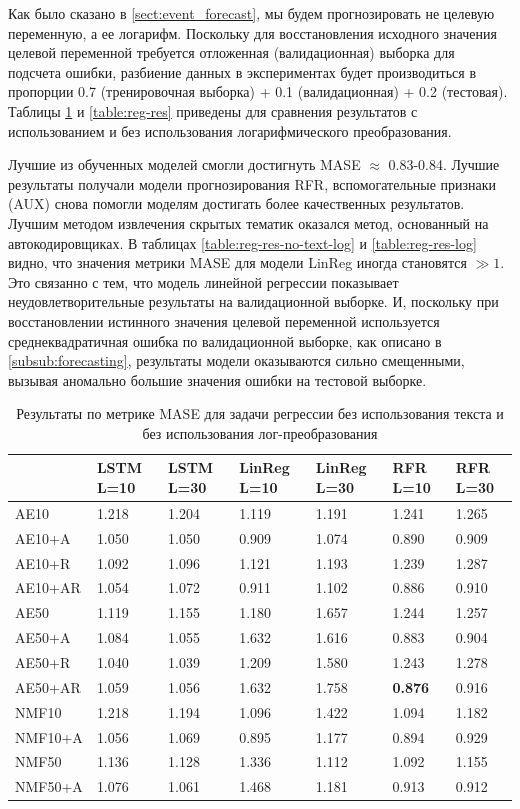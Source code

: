 Как было сказано в \ref{sect:event_forecast}, мы будем прогнозировать не целевую переменную, а ее логарифм. Поскольку для восстановления исходного значения целевой переменной требуется отложенная (валидационная) выборка для подсчета ошибки, разбиение данных в экспериментах будет производиться в пропорции 0.7 (тренировочная выборка) + 0.1 (валидационная) + 0.2 (тестовая). Таблицы \ref{table:reg-res-no-text} и \ref{table:reg-res} приведены для сравнения результатов с использованием и без использования логарифмического преобразования.

Лучшие из обученных моделей смогли достигнуть MASE $\approx$ 0.83-0.84. Лучшие результаты получали модели прогнозирования RFR, вспомогательные признаки (AUX) снова помогли моделям достигать более качественных результатов. Лучшим методом извлечения скрытых тематик оказался метод, основанный на автокодировщиках. В таблицах \ref{table:reg-res-no-text-log} и \ref{table:reg-res-log} видно, что значения метрики MASE для модели LinReg иногда становятся $\gg 1$. Это связанно с тем, что модель линейной регрессии показывает неудовлетворительные результаты на валидационной выборке. И, поскольку при восстановлении истинного значения целевой переменной используется среднеквадратичная ошибка по валидационной выборке, как описано в \ref{subsub:forecasting}, результаты модели оказываются сильно смещенными, вызывая аномально большие значения ошибки на тестовой выборке.

\begin{table}
\centering
\begin{tabular}{||p{3.8cm}|p{1.5cm}|p{1.5cm}|p{1.5cm}|p{1.5cm}|p{1.5cm}|p{1.5cm}||} 
\hline
& LSTM L=10 & LSTM L=30 & LinReg L=10 & LinReg L=30 & RFR L=10 & RFR L=30\\ \hline\hline
AE10 & 1.218 & 1.204 & 1.119 & 1.191 & 1.241 & 1.265\\ \hline
AE10+A & 1.050 & 1.050 & 0.909 & 1.074 & 0.890 & 0.909\\ \hline
AE10+R & 1.092 & 1.096 & 1.121 & 1.193 & 1.239 & 1.287\\ \hline
AE10+AR & 1.054 & 1.072 & 0.911 & 1.102 & 0.886 & 0.910\\ \hline
AE50 & 1.119 & 1.155 & 1.180 & 1.657 & 1.244 & 1.257\\ \hline
AE50+A & 1.084 & 1.055 & 1.632 & 1.616 & 0.883 & 0.904\\ \hline
AE50+R & 1.040 & 1.039 & 1.209 & 1.580 & 1.243 & 1.278\\ \hline
AE50+AR & 1.059 & 1.056 & 1.632 & 1.758 & \textbf{0.876} & 0.916\\ \hline
NMF10 & 1.218 & 1.194 & 1.096 & 1.422 & 1.094 & 1.182\\ \hline
NMF10+A & 1.056 & 1.069 & 0.895 & 1.177 & 0.894 & 0.929\\ \hline
NMF50 & 1.136 & 1.128 & 1.336 & 1.112 & 1.092 & 1.155\\ \hline
NMF50+A & 1.076 & 1.061 & 1.468 & 1.181 & 0.913 & 0.912\\ \hline
\end{tabular}
\caption{Результаты по метрике MASE для задачи регрессии без использования текста и без использования лог-преобразования}
\label{table:reg-res-no-text}
\end{table}

